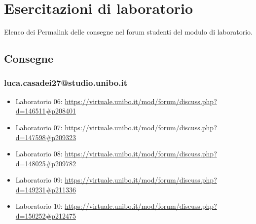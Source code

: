 \documentclass[a4paper,12pt]{report}
\begin{document}
\chapter{Esercitazioni di laboratorio}
Elenco dei Permalink delle consegne nel forum studenti del modulo di laboratorio.
\section*{Consegne}
\subsection{luca.casadei27@studio.unibo.it}
\begin{itemize}
	\item Laboratorio 06: \url{https://virtuale.unibo.it/mod/forum/discuss.php?d=146511#p208401}
	\item Laboratorio 07: \url{https://virtuale.unibo.it/mod/forum/discuss.php?d=147598#p209323}
	\item Laboratorio 08: \url{https://virtuale.unibo.it/mod/forum/discuss.php?d=148025#p209782}
	\item Laboratorio 09: \url{https://virtuale.unibo.it/mod/forum/discuss.php?d=149231#p211336}
	\item Laboratorio 10: \url{https://virtuale.unibo.it/mod/forum/discuss.php?d=150252#p212475}
\end{itemize}
\end{document}

